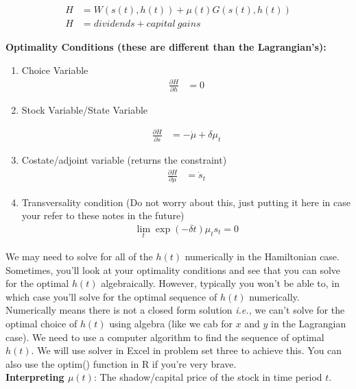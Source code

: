 \documentclass{article}
\begin{document}
\begin{align}
    H &= W(s(t), h(t))+ \mu(t) G(s(t), h(t)) \\
    H &= dividends + capital\ gains
\end{align}

\textbf{Optimality Conditions (these are different than the Lagrangian's):}
\begin{enumerate}
    \item Choice Variable 
    \begin{align}
        \frac{\partial H}{\partial h} & = 0
    \end{align}

    \item Stock Variable/State Variable 
    
    \begin{align}
        \frac{\partial H}{\partial s} & = - \dot \mu + \delta \mu_t 
    \end{align}

    \item Costate/adjoint variable (returns the constraint)
    \begin{align}
        \frac{\partial H}{\partial \mu} &= \dot s_t 
    \end{align}

    \item Transversality condition (Do not worry about this, just putting it here in case your refer to these notes in the future)
    \begin{align}
        \lim_t \exp(-\delta t) \mu_t s_t = 0
        \label{oc_trans}
    \end{align}

\end{enumerate}

We may need to solve for all of the $h(t)$ numerically in the Hamiltonian case. Sometimes, you'll look at your optimality conditions and see that you can solve for the optimal $h(t)$ algebraically. However, typically you won't be able to, in which case you'll solve for the optimal sequence of $h(t)$ numerically. Numerically means there is not a closed form solution \textit{i.e.,} we can't solve for the optimal choice of $h(t)$ using algebra (like we cab for $x$ and $y$ in the Lagrangian case). We need to use a computer algorithm to find the sequence of optimal $h(t)$. We will use solver in Excel in problem set three to achieve this. You can also use the optim() function in R if you're very brave.\\

\textbf{Interpreting $\mu(t)$}: The shadow/capital price of the stock in time period $t$. 
\end{document}
